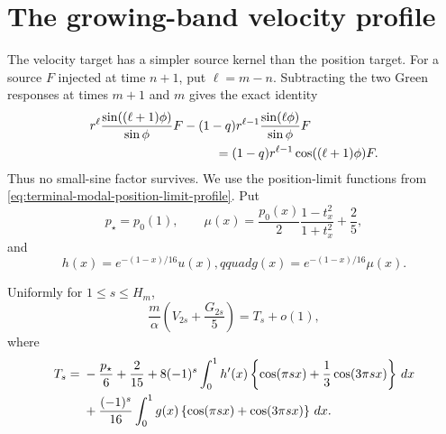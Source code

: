 \section{The growing-band velocity profile}
\label{sec:terminal-modal-velocity-profile}

The velocity target has a simpler source kernel than the position target.
For a source $F$ injected at time $n+1$, put $\ell=m-n$.  Subtracting the two
Green responses at times $m+1$ and $m$ gives the exact identity
\begin{equation}
 \begin{split}
 &r^\ell\frac{\sin((\ell+1)\phi)}{\sin\phi}F
 -(1-q)r^{\ell-1}\frac{\sin(\ell\phi)}{\sin\phi}F\\
 &\hspace{35mm}=(1-q)r^{\ell-1}\cos((\ell+1)\phi)F.
 \end{split}
 \label{eq:terminal-modal-velocity-source-kernel}
\end{equation}
Thus no small-sine factor survives.  We use the position-limit functions from
\eqref{eq:terminal-modal-position-limit-profile}.  Put
\begin{equation}
 p_\star=p_0(1),\qquad
 \mu(x)=\frac{p_0(x)}2\frac{1-t_x^2}{1+t_x^2}+\frac25,
 \label{eq:terminal-modal-velocity-limit-data}
\end{equation}
and
\begin{equation}
 h(x)=e^{-(1-x)/16}u(x),qquad
 g(x)=e^{-(1-x)/16}\mu(x).
 \label{eq:terminal-modal-velocity-amplitudes}
\end{equation}

\begin{lemma}
\label{lem:terminal-modal-velocity-limit}
Uniformly for $1\le s\le H_m$,
\begin{equation}
 \frac m\alpha\left(V_{2s}+\frac{G_{2s}}5\right)
 =T_s+o(1),
 \label{eq:terminal-modal-velocity-uniform-limit}
\end{equation}
where
\begin{align}
 T_s={}&-\frac{p_\star}{6}+\frac{2}{15}
 +8(-1)^s\int_0^1h'(x)
 \left\{\cos(\pi sx)+\frac13\cos(3\pi sx)\right\}\,dx
 \notag\\
 &+\frac{(-1)^s}{16}\int_0^1g(x)
 \left\{\cos(\pi sx)+\cos(3\pi sx)\right\}\,dx.
 \label{eq:terminal-modal-velocity-limit-functional}
\end{align}
\end{lemma}

